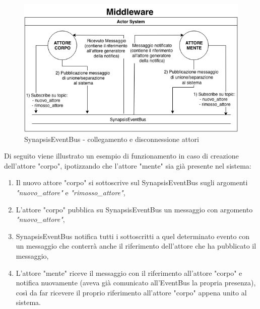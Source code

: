 \begin{figure}[H]
\centering
\includegraphics[width=\textwidth]{figures/SynapsisEventBus.png}
\caption{SynapsisEventBus - collegamento e disconnessione attori}
\end{figure}

Di seguito viene illustrato un esempio di funzionamento in caso di creazione dell'attore "corpo", ipotizzando che l'attore "mente" sia già presente nel sistema:
\begin{enumerate}
    \item Il nuovo attore "corpo" si sottoscrive sul SynapsisEventBus sugli argomenti \textit{"nuovo\_attore"} e \textit{"rimosso\_attore"},
    \item L'attore "corpo" pubblica su SynapsisEventBus un messaggio con argomento \textit{"nuovo\_attore"},
    \item SynapsisEventBus notifica tutti i sottoscritti a quel determinato evento con un messaggio che conterrà anche il riferimento dell'attore che ha pubblicato il messaggio,
    \item L'attore "mente" riceve il messaggio con il riferimento all'attore "corpo" e notifica nuovamente (aveva già comunicato all'EventBus la propria presenza), così da far ricevere il proprio riferimento all'attore "corpo" appena unito al sistema.
\end{enumerate}
